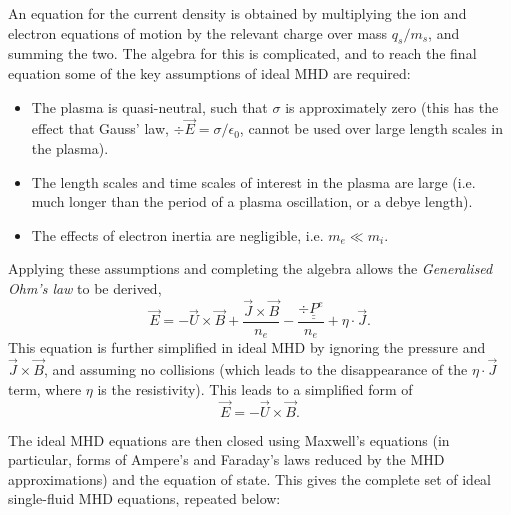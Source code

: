 An equation for the current density is obtained by multiplying the ion and electron equations of motion by the relevant charge over mass $q_s/m_s$, and summing the two. The algebra for this is complicated, and to reach the final equation some of the key assumptions of ideal MHD are required:
\begin{itemize}
	\item{The plasma is quasi-neutral, such that $\sigma$ is approximately zero (this has the effect that Gauss' law, $\div \vec{E} = \sigma / \epsilon_0$, cannot be used over large length scales in the plasma).}
	\item{The length scales and time scales of interest in the plasma are large (i.e. much longer than the period of a plasma oscillation, or a debye length).}
	\item{The effects of electron inertia are negligible, i.e. $m_e \ll m_i$.}
\end{itemize}
Applying these assumptions and completing the algebra allows the \textit{Generalised Ohm's law} to be derived, 
\begin{equation} \vec{E} = -\vec{U}\times\vec{B} + \frac{\vec{J} \times \vec{B}}{n_e} - \frac{\div \underline{\underline{P}}^e}{n_e} + \eta \cdot \vec{J}. \end{equation}
This equation is further simplified in ideal MHD by ignoring the pressure and $\vec{J} \times \vec{B}$, and assuming no collisions (which leads to the disappearance of the $\eta \cdot \vec{J}$ term, where $\eta$ is the resistivity). This leads to a simplified form of 
\begin{equation} \vec{E} = -\vec{U}\times\vec{B} . \end{equation}


The ideal MHD equations are then closed using Maxwell's equations (in particular, forms of Ampere's and Faraday's laws reduced by the MHD approximations) and the equation of state. This gives the complete set of ideal single-fluid MHD equations, repeated below:

